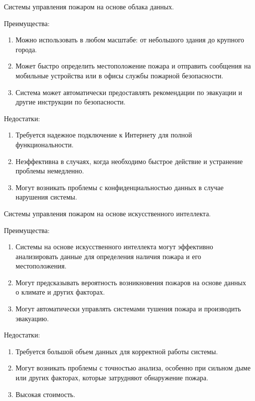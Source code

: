 \begin{multicols}{2}
Системы управления пожаром на основе облака данных.

Преимущества:

\begin{enumerate}
\def\labelenumi{\arabic{enumi}.}
\item
  Можно использовать в любом масштабе: от небольшого здания до крупного
  города.
\item
  Может быстро определить местоположение пожара и отправить сообщения на
  мобильные устройства или в офисы службы пожарной безопасности.
\item
  Система может автоматически предоставлять рекомендации по эвакуации и
  другие инструкции по безопасности.
\end{enumerate}

Недостатки:

\begin{enumerate}
\def\labelenumi{\arabic{enumi}.}
\item
  Требуется надежное подключение к Интернету для полной
  функциональности.
\item
  Неэффективна в случаях, когда необходимо быстрое действие и устранение
  проблемы немедленно.
\item
  Могут возникать проблемы с конфиденциальностью данных в случае
  нарушения системы.
\end{enumerate}

Системы управления пожаром на основе искусственного интеллекта.

Преимущества:

\begin{enumerate}
\def\labelenumi{\arabic{enumi}.}
\item
  Системы на основе искусственного интеллекта могут эффективно
  анализировать данные для определения наличия пожара и его
  местоположения.
\item
  Могут предсказывать вероятность возникновения пожаров на основе данных
  о климате и других факторах.
\item
  Могут автоматически управлять системами тушения пожара и производить
  эвакуацию.
\end{enumerate}

Недостатки:

\begin{enumerate}
\def\labelenumi{\arabic{enumi}.}
\item
  Требуется большой объем данных для корректной работы системы.
\item
  Могут возникать проблемы с точностью анализа, особенно при сильном
  дыме или других факторах, которые затрудняют обнаружение пожара.
\item
  Высокая стоимость.
\end{enumerate}


\end{multicols}
